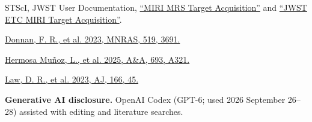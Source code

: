 \documentclass[12pt]{article}
\begin{document}
\noindent [48] STScI, JWST User Documentation, \href{https://jwst-docs.stsci.edu/jwst-mid-infrared-instrument/miri-operations/miri-target-acquisition/miri-mrs-target-acquisition}{``MIRI MRS Target Acquisition''} and \href{https://jwst-docs.stsci.edu/jwst-exposure-time-calculator-overview/jwst-etc-calculations-page-overview/jwst-etc-target-acquisition/jwst-etc-miri-target-acquisition}{``JWST ETC MIRI Target Acquisition''}.\par
\noindent [49] \href{https://academic.oup.com/mnras/article/519/3/3691/6948335}{Donnan, F. R., et al. 2023, MNRAS, 519, 3691.}\par
\noindent [50] \href{https://doi.org/10.1051/0004-6361/202452437}{Hermosa Mu\~noz, L., et al. 2025, A\&A, 693, A321.}\par
\noindent [51] \href{https://doi.org/10.3847/1538-3881/acdddc}{Law, D. R., et al. 2023, AJ, 166, 45.}\par

\noindent\textbf{Generative AI disclosure.} OpenAI Codex (GPT-6; used 2026 September 26--28) assisted with editing and literature searches.\par
\templateversion
\end{document}
